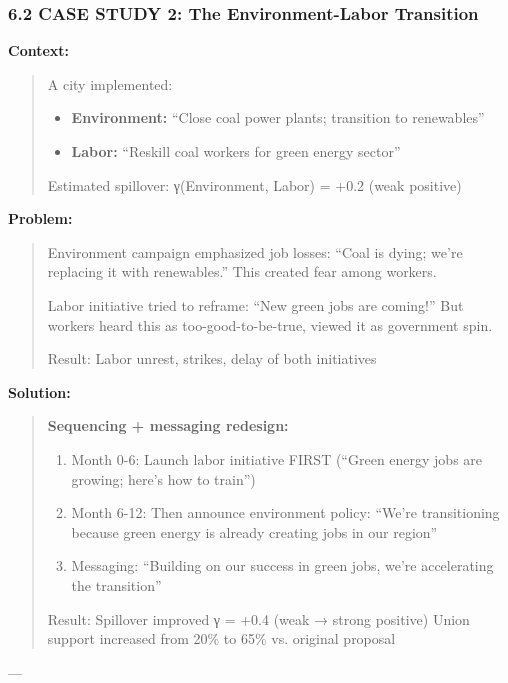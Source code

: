 \subsubsection*{6.2 CASE STUDY 2: The Environment-Labor Transition}

\textbf{Context:}
\begin{quote}
A city implemented:
\begin{itemize}[nosep]
\item \textbf{Environment:} ``Close coal power plants; transition to renewables''
\item \textbf{Labor:} ``Reskill coal workers for green energy sector''
\end{itemize}

Estimated spillover: γ(Environment, Labor) = +0.2 (weak positive)
\end{quote}

\textbf{Problem:}
\begin{quote}
Environment campaign emphasized job losses: ``Coal is dying; we're replacing it with renewables.'' This created fear among workers.

Labor initiative tried to reframe: ``New green jobs are coming!'' But workers heard this as too-good-to-be-true, viewed it as government spin.

Result: Labor unrest, strikes, delay of both initiatives
\end{quote}

\textbf{Solution:}
\begin{quote}
\textbf{Sequencing + messaging redesign:}
\begin{enumerate}
\item Month 0-6: Launch labor initiative FIRST (``Green energy jobs are growing; here's how to train'')
\item Month 6-12: Then announce environment policy: ``We're transitioning because green energy is already creating jobs in our region''
\item Messaging: ``Building on our success in green jobs, we're accelerating the transition''
\end{enumerate}

Result: Spillover improved γ = +0.4 (weak → strong positive)
Union support increased from 20\% to 65\% vs. original proposal
\end{quote}

---


